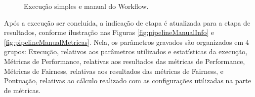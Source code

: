 \documentclass[portugues]{ic-tese}
\begin{document}
\begin{figure}[H]
    \centering
    \caption{Execução simples e manual do Workflow.}
    \label{fig:pipelineManual}
\end{figure}

Após a execução ser concluída,  a indicação de etapa é atualizada para a etapa de resultados, conforme ilustração nas Figuras \ref{fig:pipelineManualInfo} e \ref{fig:pipelineManualMetricas}. Nela, os parâmetros gravados são organizados em 4 grupos: Execução, relativos aos parâmetros utilizados e estatísticas da execução, Métricas de Performance, relativas aos resultados das métricas de Performance, Métricas de Fairness, relativas aos resultados das métricas de Fairness, e Pontuação, relativas ao cálculo realizado com as configurações utilizadas na parte de métricas.
\end{document}
